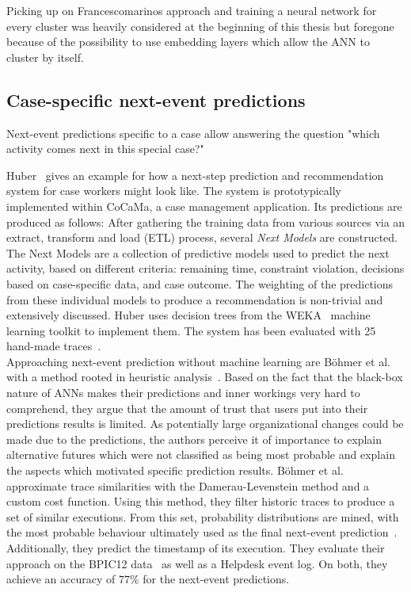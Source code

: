 Picking up on Francescomarinos approach and training a neural network for every cluster was heavily considered at the beginning of this thesis but foregone because of the possibility to use embedding layers which allow the ANN to cluster by itself.

\subsection*{Case-specific next-event predictions}
Next-event predictions specific to a case allow answering the question "which activity comes next in this special case?"

Huber~\cite{hauder2014} gives an example for how a next-step prediction and recommendation system for case workers might look like. The system is prototypically implemented within CoCaMa, a case management application. Its predictions are produced as follows: After gathering the training data from various sources via an extract, transform and load (ETL) process, several \textit{Next Models} are constructed. The Next Models are a collection of predictive models used to predict the next activity, based on different criteria: remaining time, constraint violation, decisions based on case-specific data, and case outcome. The weighting of the predictions from these individual models to produce a recommendation is non-trivial and extensively discussed. Huber uses decision trees from the WEKA~\cite{web:weka} machine learning toolkit to implement them. The system has been evaluated with 25 hand-made traces~\cite{huber2015}.\\

Approaching next-event prediction without machine learning are Böhmer et al. with a method rooted in heuristic analysis~\cite{boehmer2018probability}. Based on the fact that the black-box nature of ANNs makes their predictions and inner workings very hard to comprehend, they argue that the amount of trust that users put into their predictions results is limited. As potentially large organizational changes could be made due to the predictions, the authors perceive it of importance to explain alternative futures which were not classified as being most probable and explain the aspects which motivated specific prediction results.
Böhmer et al. approximate trace similarities with the Damerau-Levenstein method and a custom cost function. Using this method, they filter historic traces to produce a set of similar executions. From this set, probability distributions are mined, with the most probable behaviour ultimately used as the final next-event prediction~\cite{boehmer2018probability}. Additionally, they predict the timestamp of its execution. They evaluate their approach on the BPIC12 data~\cite{BPIC2012} as well as a Helpdesk event log. On both, they achieve an accuracy of $77\%$ for the next-event predictions.\\

